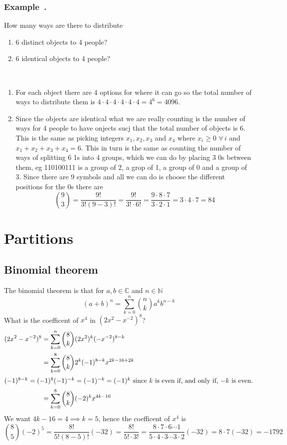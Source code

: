 \documentclass{article}
\newcommand{\bb}[1]{\mathbb{#1}}
\newcommand{\A}{\,\forall\,}
\newcommand{\binomeq}[2]{\frac{{#1}!}{{#2}!({#1}-{#2})!}}
\newcounter{example}[section]
\newenvironment{example}[1][]{\refstepcounter{example}\vspace{-0.2cm}
\subsubsection*{Example~\thesection.\theexample} \rmfamily}{\par}
\begin{document}
\begin{example}
How many ways are there to distribute
\begin{enumerate}
\renewcommand{\labelenumi}{(\alph{enumi})}
\item 6 distinct objects to 4 people?
\item 6 identical objects to 4 people?
\end{enumerate}~\\[-2em]

\begin{enumerate}
\renewcommand{\labelenumi}{(\alph{enumi})}
\item For each object there are 4 options for where it can go so the total number of ways to distribute them is \(4\cdot4\cdot4\cdot4\cdot4\cdot4=4^6=4096\).
\item Since the objects are identical what we are really counting is the number of ways for 4 people to have onjects sucj that the total number of objects is 6. This is the same as picking integers \(x_1,x_2,x_3\) and \(x_4\) where \(x_i\ge 0\,\A i\) and \(x_1+x_2+x_3+x_4=6\). This in turn is the same as counting the number of ways of splitting 6 1s into 4 groups, which we can do by placing 3 0s between them, eg 110100111 is a group of 2, a grop of 1, a group of 0 and a group of 3. Since there are 9 symbols and all we can do is choose the different positions for the 0s there are
\[\binom 93=\frac{9!}{3!(9-3)!}=\frac{9!}{3!\cdot6!}=\frac{9\cdot8\cdot7}{3\cdot2\cdot1}=3\cdot4\cdot7=84\]
\end{enumerate}
\end{example}
\section{Partitions}

\subsection*{Binomial theorem}
The binomial theorem is that for \(a,b\in\bb C\) and \(n\in\bb N\)
\[(a+b)^n=\sum_{k=0}^n\binom nka^kb^{n-k}\]
What is the coefficent of \(x^4\) in \((2x^2-x^{-2})^8\)?
\begin{align*}
(2x^2-x^{-2})^8&=\sum_{k=0}^n\binom{8}{k}(2x^2)^k(-x^{-2})^{8-k}\\
&=\sum_{k=0}^8\binom{8}{k}2^k(-1)^{8-k}x^{2k-16+2k}\\
\intertext{\((-1)^{8-k}=(-1)^8(-1)^{-k}=(-1)^{-k}=(-1)^k\) since \(k\) is even if, and only if,  \(-k\) is even.} 
&=\sum_{k=0}^8\binom{8}{k}(-2)^kx^{4k-16}\\
\end{align*}
We want \(4k-16=4\implies k=5\), hence the coefficent of \(x^4\) is
\[\binom 85(-2)^5=\binomeq 85(-32)=\frac{8!}{5!\cdot3!}=\frac{8\cdot7\cdot6\dotsm1}{5\cdot4\cdot3\dotsm3\cdot2}(-32)=8\cdot7(-32)=-1792\]
\end{document}
